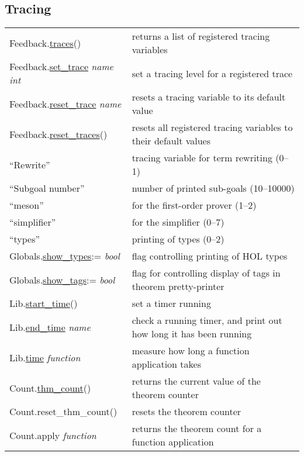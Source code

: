 \documentclass[landscape,10pt]{article}
\newcommand{\hol}[2]{{\sffamily #1.\href{#1.#2.html}{#2}}}
\newcommand{\holnoref}[2]{{\sffamily #1.#2}}
\newcommand{\var}[1]{{\emph{#1}}}
\begin{document}
\begin{multicols}{2}
\subsection*{Tracing}
\begin{tabular}{ll}
\hol{Feedback}{traces}() & returns a list of registered tracing variables \\
\hol{Feedback}{set_trace} \var{name} \var{int} & set a tracing level for a registered trace \\
\hol{Feedback}{reset_trace} \var{name} & resets a tracing variable to its default value \\
\hol{Feedback}{reset_traces}() & resets all registered tracing variables to their default values \\[4pt]
\quad \textsf{``Rewrite''} & tracing variable for term rewriting (0--1) \\
\quad \textsf{``Subgoal number''} & number of printed sub-goals (10--10000) \\
\quad \textsf{``meson''} & for the first-order prover (1--2) \\
\quad \textsf{``simplifier''} & for the simplifier (0--7) \\
\quad \textsf{``types''} & printing of types (0--2) \\[4pt]
\hol{Globals}{show_types}:= \var{bool} & flag controlling printing of HOL types \\
\hol{Globals}{show_tags}:= \var{bool} & flag for controlling display of tags in theorem pretty-printer \\[4pt]
\hol{Lib}{start_time}() & set a timer running \\
\hol{Lib}{end_time} \var{name} & check a running timer, and print out how long it has been running \\
\hol{Lib}{time} \var{function} & measure how long a function application takes \\
\hol{Count}{thm_count}() & returns the current value of the theorem counter \\
\holnoref{Count}{reset_thm_count}() & resets the theorem counter \\
\holnoref{Count}{apply} \var{function} & returns the theorem count for a function application \\
\end{tabular}
\end{multicols}
\end{document}
